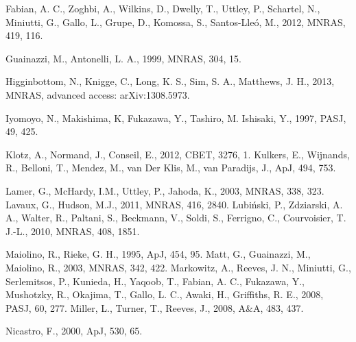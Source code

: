 \documentclass[useAMS,usenatbib]{sam}
\begin{document}
\begin{thebibliography}{99}
     Fabian, A. C., Zoghbi, A., Wilkins, D., Dwelly, T., Uttley, P., Schartel, N., Miniutti, G., Gallo,
L., Grupe, D., Komossa, S., Santos-Lleó, M., 2012, MNRAS, 419, 116.
    
     Guainazzi, M., Antonelli, L. A., 1999, MNRAS, 304, 15.

     Higginbottom, N., Knigge, C., Long, K. S., Sim, S. A., Matthews, J. H., 2013, MNRAS,
advanced  access: arXiv:1308.5973.
    
     Iyomoyo, N., Makishima, K, Fukazawa, Y., Tashiro, M. Ishisaki, Y., 1997, PASJ, 49, 425.
    
     Klotz, A., Normand, J., Conseil, E., 2012, CBET, 3276, 1.
     Kulkers, E., Wijnands, R., Belloni, T., Mendez, M., van Der Klis, M., van Paradijs, J., ApJ, 494,
753.
    
     Lamer, G., McHardy, I.M., Uttley, P., Jahoda, K., 2003, MNRAS, 338, 323.
     Lavaux, G., Hudson, M.J., 2011, MNRAS, 416, 2840.
     Lubi\'{n}ski, P., Zdziarski, A. A., Walter, R., Paltani, S., Beckmann, V., Soldi, S.,
Ferrigno, C., Courvoisier, T. J.-L., 2010, MNRAS, 408, 1851.

     Maiolino, R., Rieke, G. H., 1995, ApJ, 454, 95.
     Matt, G., Guainazzi, M., Maiolino, R., 2003, MNRAS, 342, 422.
     Markowitz, A., Reeves, J. N., Miniutti, G., Serlemitsos, P., Kunieda, H., Yaqoob, T., Fabian, A.
C., Fukazawa, Y., Mushotzky, R., Okajima, T., Gallo, L. C., Awaki, H., Griffiths, R. E., 2008, PASJ, 60, 277.
     Miller, L., Turner, T., Reeves, J., 2008, A\&A, 483, 437.
    
    
     Nicastro, F., 2000, ApJ, 530, 65.
    

\end{thebibliography}
\end{document}
